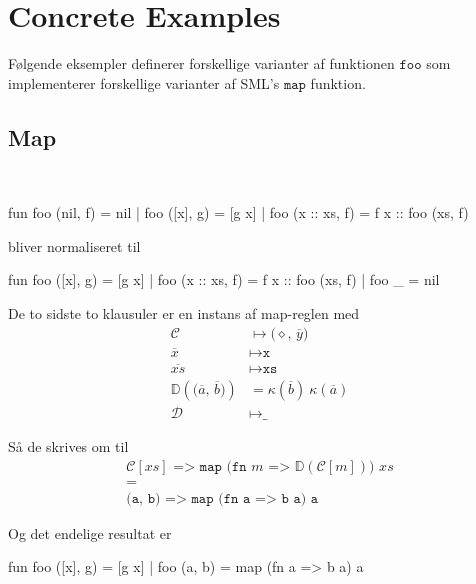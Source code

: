 \chapter{Concrete Examples}


Følgende eksempler definerer forskellige varianter af funktionen $\texttt{foo}$
som implementerer forskellige varianter af SML's $\texttt{map}$ funktion.

\section{Map}

\begin{example}\
\begin{sml}
fun foo (nil, f)     = nil
  | foo ([x], g)     = [g x]
  | foo (x :: xs, f) = f x :: foo (xs, f)
\end{sml}

bliver normaliseret til

\begin{sml}
fun foo ([x], g)     = [g x]
  | foo (x :: xs, f) = f x :: foo (xs, f)
  | foo _            = nil
\end{sml}

De to sidste to klausuler er en instans af \textsf{map}-reglen med
\begin{eqnarray*}[rl]
\mathcal{C} &\mapsto \texttt{($\diamond$, $\overline{y}$)}\\
\overline{x} &\mapsto \texttt{x}\\
\overline{xs} &\mapsto \texttt{xs}\\
\mathbb{D}(\texttt{($\overline{a}$, $\overline{b}$)}) &= \kappa(\overline{b})\
\kappa(\overline{a})\\
\mathcal{D} &\mapsto \texttt{\_}
\end{eqnarray*}

Så de skrives om til
  \begin{eqnarray*}[c]
    \texttt{$\mathcal{C}[xs]$ => map (fn $m$ =>
      $\mathbb{D}(\mathcal{C}[m])$) $xs$}\\
    =\\
    \texttt{(a, b) => map (fn a => b a) a}
  \end{eqnarray*}
  
Og det endelige resultat er

\begin{sml}
fun foo ([x], g) = [g x]
  | foo (a, b)   = map (fn a => b a) a
\end{sml}

\end{example}

